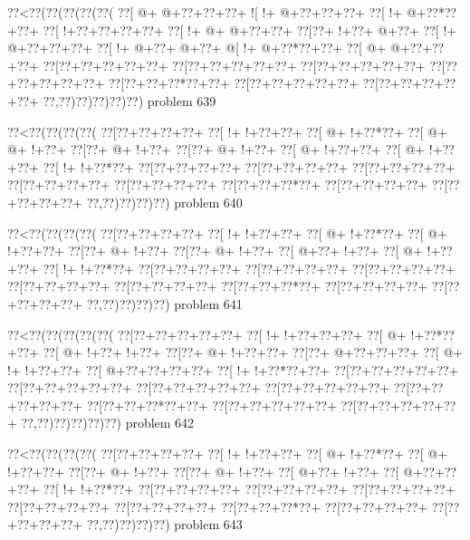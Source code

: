 \vbox{\vbox{\goo
\0??<\0??(\0??(\0??(\0??(\0??(
\0??[\- @+\- @+\0??+\0??+\0??+
\- ![\- !+\- @+\0??+\0??+\0??+
\0??[\- !+\- @+\0??*\0??+\0??+
\0??[\- !+\0??+\0??+\0??+\0??+
\0??[\- !+\- @+\- @+\0??+\0??+
\0??[\0??+\- !+\0??+\- @+\0??+
\0??[\- !+\- @+\0??+\0??+\0??+
\0??[\- !+\- @+\0??+\- @+\0??+
\- @[\- !+\- @+\0??*\0??+\0??+
\0??[\- @+\- @+\0??+\0??+\0??+
\0??[\0??+\0??+\0??+\0??+\0??+
\0??[\0??+\0??+\0??+\0??+\0??+
\0??[\0??+\0??+\0??+\0??+\0??+
\0??[\0??+\0??+\0??+\0??+\0??+
\0??[\0??+\0??+\0??*\0??+\0??+
\0??[\0??+\0??+\0??+\0??+\0??+
\0??[\0??+\0??+\0??+\0??+\0??+
\0??,\0??)\0??)\0??)\0??)\0??)
}
\hfil problem 639\hfil\break
}

\vbox{\vbox{\goo
\0??<\0??(\0??(\0??(\0??(
\0??[\0??+\0??+\0??+\0??+
\0??[\- !+\- !+\0??+\0??+
\0??[\- @+\- !+\0??*\0??+
\0??[\- @+\- @+\- !+\0??+
\0??[\0??+\- @+\- !+\0??+
\0??[\0??+\- @+\- !+\0??+
\0??[\- @+\- !+\0??+\0??+
\0??[\- @+\- !+\0??+\0??+
\0??[\- !+\- !+\0??*\0??+
\0??[\0??+\0??+\0??+\0??+
\0??[\0??+\0??+\0??+\0??+
\0??[\0??+\0??+\0??+\0??+
\0??[\0??+\0??+\0??+\0??+
\0??[\0??+\0??+\0??+\0??+
\0??[\0??+\0??+\0??*\0??+
\0??[\0??+\0??+\0??+\0??+
\0??[\0??+\0??+\0??+\0??+
\0??,\0??)\0??)\0??)\0??)
}
\hfil problem 640\hfil\break
}

\vbox{\vbox{\goo
\0??<\0??(\0??(\0??(\0??(
\0??[\0??+\0??+\0??+\0??+
\0??[\- !+\- !+\0??+\0??+
\0??[\- @+\- !+\0??*\0??+
\0??[\- @+\- !+\0??+\0??+
\0??[\0??+\- @+\- !+\0??+
\0??[\0??+\- @+\- !+\0??+
\0??[\- @+\0??+\- !+\0??+
\0??[\- @+\- !+\0??+\0??+
\0??[\- !+\- !+\0??*\0??+
\0??[\0??+\0??+\0??+\0??+
\0??[\0??+\0??+\0??+\0??+
\0??[\0??+\0??+\0??+\0??+
\0??[\0??+\0??+\0??+\0??+
\0??[\0??+\0??+\0??+\0??+
\0??[\0??+\0??+\0??*\0??+
\0??[\0??+\0??+\0??+\0??+
\0??[\0??+\0??+\0??+\0??+
\0??,\0??)\0??)\0??)\0??)
}
\hfil problem 641\hfil\break
}

\vbox{\vbox{\goo
\0??<\0??(\0??(\0??(\0??(\0??(
\0??[\0??+\0??+\0??+\0??+\0??+
\0??[\- !+\- !+\0??+\0??+\0??+
\0??[\- @+\- !+\0??*\0??+\0??+
\0??[\- @+\- !+\0??+\- !+\0??+
\0??[\0??+\- @+\- !+\0??+\0??+
\0??[\0??+\- @+\0??+\0??+\0??+
\0??[\- @+\- !+\- !+\0??+\0??+
\0??[\- @+\0??+\0??+\0??+\0??+
\0??[\- !+\- !+\0??*\0??+\0??+
\0??[\0??+\0??+\0??+\0??+\0??+
\0??[\0??+\0??+\0??+\0??+\0??+
\0??[\0??+\0??+\0??+\0??+\0??+
\0??[\0??+\0??+\0??+\0??+\0??+
\0??[\0??+\0??+\0??+\0??+\0??+
\0??[\0??+\0??+\0??*\0??+\0??+
\0??[\0??+\0??+\0??+\0??+\0??+
\0??[\0??+\0??+\0??+\0??+\0??+
\0??,\0??)\0??)\0??)\0??)\0??)
}
\hfil problem 642\hfil\break
}

\vbox{\vbox{\goo
\0??<\0??(\0??(\0??(\0??(
\0??[\0??+\0??+\0??+\0??+
\0??[\- !+\- !+\0??+\0??+
\0??[\- @+\- !+\0??*\0??+
\0??[\- @+\- !+\0??+\0??+
\0??[\0??+\- @+\- !+\0??+
\0??[\0??+\- @+\- !+\0??+
\0??[\- @+\0??+\- !+\0??+
\0??[\- @+\0??+\0??+\0??+
\0??[\- !+\- !+\0??*\0??+
\0??[\0??+\0??+\0??+\0??+
\0??[\0??+\0??+\0??+\0??+
\0??[\0??+\0??+\0??+\0??+
\0??[\0??+\0??+\0??+\0??+
\0??[\0??+\0??+\0??+\0??+
\0??[\0??+\0??+\0??*\0??+
\0??[\0??+\0??+\0??+\0??+
\0??[\0??+\0??+\0??+\0??+
\0??,\0??)\0??)\0??)\0??)
}
\hfil problem 643\hfil\break
}

